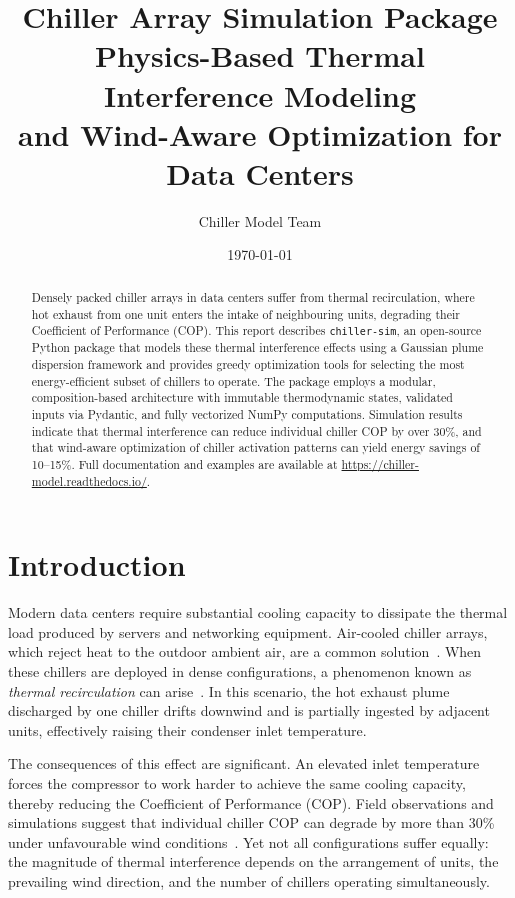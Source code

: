 \documentclass[11pt, a4paper]{article}
\title{%
    \textbf{Chiller Array Simulation Package} \\[0.4em]
    \large Physics-Based Thermal Interference Modeling \\
    and Wind-Aware Optimization for Data Centers%
}
\author{Chiller Model Team}
\date{\today}
\begin{document}

\maketitle

\begin{abstract}
Densely packed chiller arrays in data centers suffer from thermal recirculation, where hot exhaust from one unit enters the intake of neighbouring units, degrading their Coefficient of Performance (COP).
This report describes \texttt{chiller-sim}, an open-source Python package that models these thermal interference effects using a Gaussian plume dispersion framework and provides greedy optimization tools for selecting the most energy-efficient subset of chillers to operate.
The package employs a modular, composition-based architecture with immutable thermodynamic states, validated inputs via Pydantic, and fully vectorized NumPy computations.
Simulation results indicate that thermal interference can reduce individual chiller COP by over 30\%, and that wind-aware optimization of chiller activation patterns can yield energy savings of 10--15\%.
Full documentation and examples are available at \url{https://chiller-model.readthedocs.io/}.
\end{abstract}

\section{Introduction}
\label{sec:introduction}

Modern data centers require substantial cooling capacity to dissipate the thermal load produced by servers and networking equipment.
Air-cooled chiller arrays, which reject heat to the outdoor ambient air, are a common solution~\cite{cho2014datacenter}.
When these chillers are deployed in dense configurations, a phenomenon known as \emph{thermal recirculation} can arise~\cite{ashrae2020hvac}.
In this scenario, the hot exhaust plume discharged by one chiller drifts downwind and is partially ingested by adjacent units, effectively raising their condenser inlet temperature.

The consequences of this effect are significant.
An elevated inlet temperature forces the compressor to work harder to achieve the same cooling capacity, thereby reducing the Coefficient of Performance (COP).
Field observations and simulations suggest that individual chiller COP can degrade by more than 30\% under unfavourable wind conditions~\cite{ashrae2019applications}.
Yet not all configurations suffer equally: the magnitude of thermal interference depends on the arrangement of units, the prevailing wind direction, and the number of chillers operating simultaneously.
\end{document}
